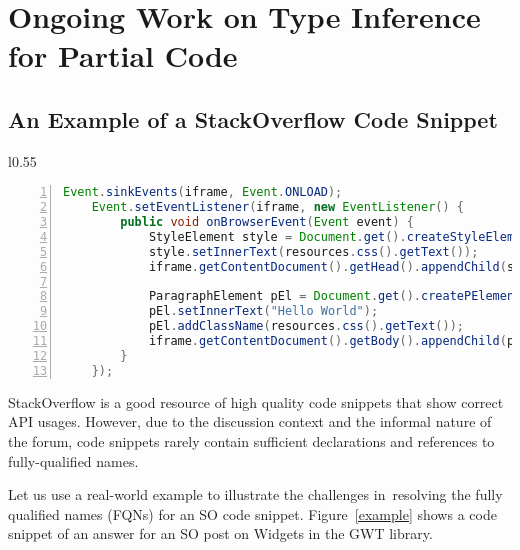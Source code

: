 \section{Ongoing Work on Type Inference for Partial Code}
\label{sec:statype}

\subsection{An Example of a StackOverflow Code Snippet}

\begin{wrapfigure}{l}{0.55\textwidth}
\begin{lstlisting}[basicstyle=\scriptsize\sffamily, stepnumber=1, numbers=left, numbersep=-6pt, framexleftmargin=0mm, framexrightmargin=0mm, language=Java, emph ={Event,sinkEvents,iframe,setEventListener,EventListener,StyleElement,Document,get,createStyleElement,setInnerText,resources,css,getText,getContentDocument,getHead,getBody,appendChild,ParagraphElement,createPElement,addClassName,whatever}]
    Event.sinkEvents(iframe, Event.ONLOAD);
    Event.setEventListener(iframe, new EventListener() {
        public void onBrowserEvent(Event event) {
            StyleElement style = Document.get().createStyleElement();
            style.setInnerText(resources.css().getText());
            iframe.getContentDocument().getHead().appendChild(style);

            ParagraphElement pEl = Document.get().createPElement();
            pEl.setInnerText("Hello World");
            pEl.addClassName(resources.css().getText());
            iframe.getContentDocument().getBody().appendChild(pEl);
        }
    });
\end{lstlisting}
\vspace{-0.1in}
\caption{StackOverflow post \#34595450 on GWT Widgets~\cite{soexample}}
\label{example}
\end{wrapfigure}

StackOverflow is a good resource of high quality code snippets that
show correct API usages. However, due to the discussion context and
the informal nature of the forum, code snippets rarely contain
sufficient declarations and references to fully-qualified names.


Let us use a real-world example to illustrate the 
challenges in~resolving 
the fully qualified names (FQNs) 
for an SO code snippet. Figure~\ref{example} shows a
code snippet of an answer for an SO post
on Widgets in the GWT library. 

